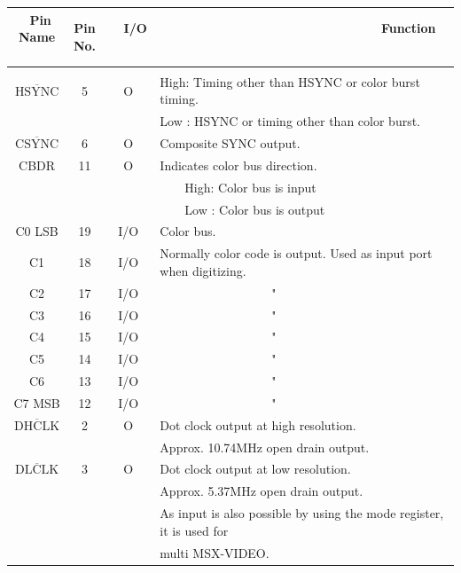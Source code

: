 \documentclass[a4paper,10pt]{article}
\begin{document}
\newpage

\fontsize{10pt}{10pt}\selectfont
\setlength{\arrayrulewidth}{0.1em}
\setlength{\tabcolsep}{0.5em}
\renewcommand{\arraystretch}{1.4}
\noindent \begin{tabular}{|c|c|c|l|}
\hline
\ Pin Name \ & Pin No. & \ \ I/O \ \ & \ \ \ \ \ \ \ \ \ \ \ \ \ \ \ \ \ \ \ \ \ \ \ \ \ \ \ \ \ \ \ Function \ \ \ \ \ \ \ \ \ \ \ \ \ \ \ \ \ \ \ \ \ \ \ \ \ \ \ \ \ \ \ \\
\hline
& & &\\[-2.8em]
$\overline{\mbox{HSYNC}}$ & 5 & O & High: Timing other than HSYNC or color burst timing.\\[-1.04em]
& & & Low : HSYNC or timing other than color burst.\\[-1.04em]
$\overline{\mbox{CSYNC}}$ & 6 & O & Composite SYNC output.\\[-1.04em]
CBDR & 11 & O & Indicates color bus direction.\\[-1.04em]
& & & \ \ \ \ High: Color bus is input\\[-1.04em]
& & & \ \ \ \ Low : Color bus is output\\[-1.04em]
C0 LSB & 19 & I/O & Color bus.\\[-1.04em]
C1 & 18 & I/O & Normally color code is output. Used as input port when digitizing.\\[-1.04em]
C2 & 17 & I/O & \ \ \ \ \ \ \ \ \ \ \ \ \ \ \ \ \ \ "\\[-1.04em]
C3 & 16 & I/O & \ \ \ \ \ \ \ \ \ \ \ \ \ \ \ \ \ \ "\\[-1.04em]
C4 & 15 & I/O & \ \ \ \ \ \ \ \ \ \ \ \ \ \ \ \ \ \ "\\[-1.04em]
C5 & 14 & I/O & \ \ \ \ \ \ \ \ \ \ \ \ \ \ \ \ \ \ "\\[-1.04em]
C6 & 13 & I/O & \ \ \ \ \ \ \ \ \ \ \ \ \ \ \ \ \ \ "\\[-1.04em]
C7 MSB & 12 & I/O & \ \ \ \ \ \ \ \ \ \ \ \ \ \ \ \ \ \ "\\[-1.04em]
$\overline{\mbox{DHCLK}}$ & 2 & O & Dot clock output at high resolution.\\[-1.04em]
& & & Approx. 10.74MHz open drain output.\\[-1.04em]
$\overline{\mbox{DLCLK}}$ & 3 & O & Dot clock output at low resolution.\\[-1.04em]
& & & Approx. 5.37MHz open drain output.\\[-1.04em]
& & & As input is also possible by using the mode register, it is used for\\[-1.04em]
& & & multi MSX-VIDEO.\\[-1.04em]

\end{tabular}
\end{document}
